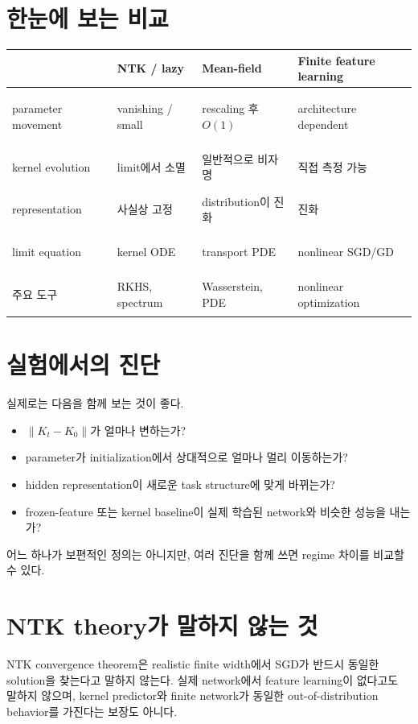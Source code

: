 \documentclass[11pt,a4paper,oneside,openany]{memoir}
\theoremstyle{definition}
\begin{document}
\section{한눈에 보는 비교}
\begin{center}\small
\begin{tabularx}{\textwidth}{>{\bfseries\raggedright\arraybackslash}p{}XXX}
\toprule
 & NTK / lazy & Mean-field & Finite feature learning\\
\midrule
parameter movement & vanishing / small & rescaling 후 $O(1)$ & architecture dependent\\
kernel evolution & limit에서 소멸 & 일반적으로 비자명 & 직접 측정 가능\\
representation & 사실상 고정 & distribution이 진화 & 진화\\
limit equation & kernel ODE & transport PDE & nonlinear SGD/GD\\
주요 도구 & RKHS, spectrum & Wasserstein, PDE & nonlinear optimization\\
\bottomrule
\end{tabularx}
\end{center}

\section{실험에서의 진단}
실제로는 다음을 함께 보는 것이 좋다.
\begin{itemize}
\item $\|K_t-K_0\|$가 얼마나 변하는가?
\item parameter가 initialization에서 상대적으로 얼마나 멀리 이동하는가?
\item hidden representation이 새로운 task structure에 맞게 바뀌는가?
\item frozen-feature 또는 kernel baseline이 실제 학습된 network와 비슷한 성능을 내는가?
\end{itemize}
어느 하나가 보편적인 정의는 아니지만, 여러 진단을 함께 쓰면 regime 차이를 비교할 수 있다.

\section{NTK theory가 말하지 않는 것}
NTK convergence theorem은 realistic finite width에서 SGD가 반드시 동일한 solution을 찾는다고 말하지 않는다. 실제 network에서 feature learning이 없다고도 말하지 않으며, kernel predictor와 finite network가 동일한 out-of-distribution behavior를 가진다는 보장도 아니다.
\end{document}
